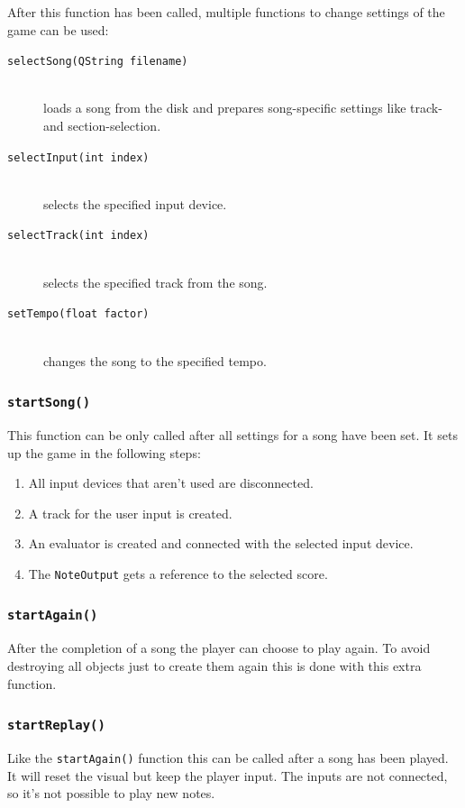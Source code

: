 After this function has been called, multiple functions to change settings of the game can be used:
\begin{description}
	\item[{\tt selectSong(QString filename)}] \hfil \\ loads a song from the disk and prepares song-specific settings like track- and section-selection.
	\item[{\tt selectInput(int index)}] \hfil \\ selects the specified input device.
	\item[{\tt selectTrack(int index)}] \hfil \\ selects the specified track from the song.
	\item[{\tt setTempo(float factor)}] \hfil \\ changes the song to the specified tempo.
\end{description}

\subsubsection{{\tt startSong()}}
\label{subsec:startSong}
This function can be only called after all settings for a song have been set. It sets up the game in the following steps:
\begin{enumerate}
	\item All input devices that aren't used are disconnected. 
	\item A track for the user input is created.
	\item An evaluator is created and connected with the selected input device.
	\item The {\tt NoteOutput} gets a reference to the selected score.
\end{enumerate}

\subsubsection{{\tt startAgain()}}
After the completion of a song the player can choose to play again. To avoid destroying all objects just to create them again this is done with this extra function.

\subsubsection{{\tt startReplay()}}
Like the {\tt startAgain()} function this can be called after a song has been played. It will reset the visual but keep the player input. The inputs are not connected, so it's not possible to play new notes.